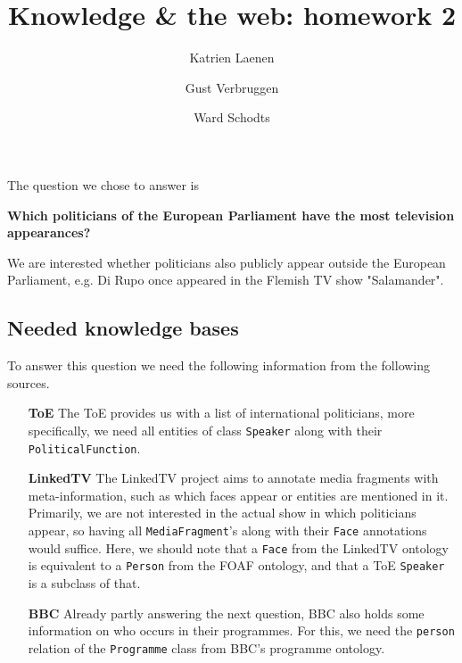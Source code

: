 \documentclass[12pt,a4paper]{article}
\author{
  Katrien Laenen\\
  \and
  Gust Verbruggen\\
  \and
  Ward Schodts
}
\title{Knowledge \& the web: homework 2}
\begin{document}
\maketitle

The question we chose to answer is 

\begin{center}
\bf \large Which politicians of the European Parliament have the most television appearances?
\end{center}
We are interested whether politicians also publicly appear outside the European Parliament, e.g. Di Rupo once appeared in the Flemish TV show "Salamander".

\subsection*{Needed knowledge bases}
To answer this question we need the following information from the following sources.
\begin{itemize}[leftmargin = 3cm]
\item[\textbf{ToE}] The ToE provides us with a list of international politicians, more specifically, we need all entities of class \texttt{Speaker} along with their \texttt{PoliticalFunction}.
\item[\textbf{LinkedTV}] The LinkedTV project aims to annotate media fragments with meta-information, such as which faces appear or entities are mentioned in it. Primarily, we are not interested in the actual show in which politicians appear, so having all \texttt{MediaFragment}'s along with their \texttt{Face} annotations would suffice. Here, we should note that a \texttt{Face} from the LinkedTV ontology is equivalent to a \texttt{Person} from the FOAF ontology, and that a ToE \texttt{Speaker} is a subclass of that.
\item[\textbf{BBC}] Already partly answering the next question, BBC also holds some information on who occurs in their programmes. For this, we need the \texttt{person} relation of the \texttt{Programme} class from BBC's programme ontology.
\end{itemize}
\end{document}
